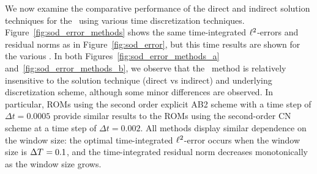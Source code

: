 We now examine the comparative performance of the direct and indirect solution techniques for the \methodAcronymROMs\ using various time discretization techniques. 
Figure~\ref{fig:sod_error_methods} 
shows the same time-integrated $\ell^2$-errors and residual norms as in Figure~\ref{fig:sod_error}, but this time results are shown for 
the various \methodAcronymROMs. In both Figures~\ref{fig:sod_error_methods_a} and~\ref{fig:sod_error_methods_b}, we observe that the \methodAcronym\ method 
is relatively insensitive to the solution technique (direct vs indirect) and underlying discretization scheme, although some minor differences are observed.
In particular, ROMs using the second order explicit AB2 scheme with a time step of $\Delta t = 0.0005$ provide similar results to the 
ROMs using the second-order CN scheme at a time step of $\Delta t = 0.002$. All methods display similar dependence on the window size: the optimal time-integrated 
$\ell^2$-error occurs when the window size is $\Delta T^{} = 0.1$, and the time-integrated residual norm decreases monotonically as the window size grows. 
